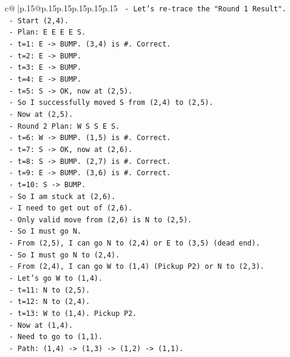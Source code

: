\documentclass{article}
\begin{document}
{\begin{supertabular}{c@{$\;$}|p{.15\linewidth}@{}p{.15\linewidth}p{.15\linewidth}p{.15\linewidth}p{.15\linewidth}p{.15\linewidth}}
{{{\texttt{  {-} Let's re{-}trace the "Round 1 Result".} \\
\texttt{  {-} Start (2,4).} \\
\texttt{  {-} Plan: E E E E S.} \\
\texttt{  {-} t=1: E {-}> BUMP. (3,4) is \#. Correct.} \\
\texttt{  {-} t=2: E {-}> BUMP.} \\
\texttt{  {-} t=3: E {-}> BUMP.} \\
\texttt{  {-} t=4: E {-}> BUMP.} \\
\texttt{  {-} t=5: S {-}> OK, now at (2,5).} \\
\texttt{  {-} So I successfully moved S from (2,4) to (2,5).} \\
\texttt{  {-} Now at (2,5).} \\
\texttt{  {-} Round 2 Plan: W S S E S.} \\
\texttt{  {-} t=6: W {-}> BUMP. (1,5) is \#. Correct.} \\
\texttt{  {-} t=7: S {-}> OK, now at (2,6).} \\
\texttt{  {-} t=8: S {-}> BUMP. (2,7) is \#. Correct.} \\
\texttt{  {-} t=9: E {-}> BUMP. (3,6) is \#. Correct.} \\
\texttt{  {-} t=10: S {-}> BUMP.} \\
\texttt{  {-} So I am stuck at (2,6).} \\
\texttt{  {-} I need to get out of (2,6).} \\
\texttt{  {-} Only valid move from (2,6) is N to (2,5).} \\
\texttt{  {-} So I must go N.} \\
\texttt{  {-} From (2,5), I can go N to (2,4) or E to (3,5) (dead end).} \\
\texttt{  {-} So I must go N to (2,4).} \\
\texttt{  {-} From (2,4), I can go W to (1,4) (Pickup P2) or N to (2,3).} \\
\texttt{  {-} Let's go W to (1,4).} \\
\texttt{  {-} t=11: N to (2,5).} \\
\texttt{  {-} t=12: N to (2,4).} \\
\texttt{  {-} t=13: W to (1,4). Pickup P2.} \\
\texttt{  {-} Now at (1,4).} \\
\texttt{  {-} Need to go to (1,1).} \\
\texttt{  {-} Path: (1,4) {-}> (1,3) {-}> (1,2) {-}> (1,1).} \\
}}}
\end{supertabular}}
\end{document}

